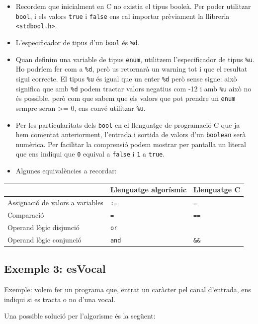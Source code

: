 \documentclass[]{book}
\providecommand{\tightlist}{%
  \setlength{\itemsep}{0pt}\setlength{\parskip}{0pt}}
\begin{document}
\begin{itemize}
\tightlist
\item
  Recordem que inicialment en C no existia el tipus booleà. Per poder
  utilitzar \texttt{bool}, i els valors \texttt{true} i \texttt{false}
  ens cal importar prèviament la llibreria
  \texttt{\textless{}stdbool.h\textgreater{}}.
\item
  L'especificador de tipus d'un \texttt{bool} és \texttt{\%d}.
\item
  Quan definim una variable de tipus \texttt{enum}, utilitzem
  l'especificador de tipus \texttt{\%u}. Ho podríem fer com a
  \texttt{\%d}, però us retornarà un warning tot i que el resultat sigui
  correcte. El tipus \texttt{\%u} és igual que un enter \texttt{\%d}
  però sense signe: això significa que amb \texttt{\%d} podem tractar
  valors negatius com -12 i amb \texttt{\%u} això no és possible, però
  com que sabem que els valors que pot prendre un \texttt{enum} sempre
  seran \textgreater{}= 0, ens convé utilitzar \texttt{\%u}.
\item
  Per les particularitats dels \texttt{bool} en el llenguatge de
  programació C que ja hem comentat anteriorment, l'entrada i sortida de
  valors d'un \texttt{boolean} serà numèrica. Per facilitar la
  comprensió podem mostrar per pantalla un literal que ens indiqui que
  \texttt{0} equival a \texttt{false} i \texttt{1} a \texttt{true}.
\item
  Algunes equivalències a recordar:
\end{itemize}

\begin{longtable}[]{@{}lll@{}}
\toprule
& Llenguatge algorísmic & Llenguatge C\tabularnewline
\midrule
\endhead
Assignació de valors a variables & \texttt{:=} &
\texttt{=}\tabularnewline
Comparació & \texttt{=} & \texttt{==}\tabularnewline
Operand lògic disjunció & \texttt{or} &
\texttt{\textbar{}\textbar{}}\tabularnewline
Operand lògic conjunció & \texttt{and} & \texttt{\&\&}\tabularnewline
\bottomrule
\end{longtable}

\subsection{Exemple 3: esVocal}\label{exemple-3-esvocal}

Exemple: volem fer un programa que, entrat un caràcter pel canal
d'entrada, ens indiqui si es tracta o no d'una vocal.

Una possible solució per l'algorisme és la següent:
\end{document}
